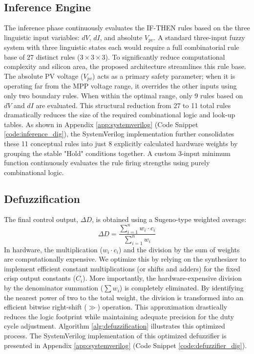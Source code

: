 \documentclass[a4paper,oneside,12pt]{report}
\numberwithin{equation}{chapter}
\begin{document}
\subsection{Inference Engine}
The inference phase continuously evaluates the IF-THEN rules based on the three linguistic input variables: $dV$, $dI$, and absolute $V_{pv}$. A standard three-input fuzzy system with three linguistic states each would require a full combinatorial rule base of 27 distinct rules ($3 \times 3 \times 3$). To significantly reduce computational complexity and silicon area, the proposed architecture streamlines this rule base. The absolute PV voltage ($V_{pv}$) acts as a primary safety parameter; when it is operating far from the MPP voltage range, it overrides the other inputs using only two boundary rules. When within the optimal range, only 9 rules based on $dV$ and $dI$ are evaluated. This structural reduction from 27 to 11 total rules dramatically reduces the size of the required combinational logic and look-up tables.
As shown in Appendix \ref{app:systemverilog} (Code Snippet \ref{code:inference_dig}), the SystemVerilog implementation further consolidates these 11 conceptual rules into just 8 explicitly calculated hardware weights by grouping the stable "Hold" conditions together. A custom 3-input minimum function continuously evaluates the rule firing strengths using purely combinational logic.

\subsection{Defuzzification}
The final control output, $\Delta D$, is obtained using a Sugeno-type weighted average:
\begin{equation}
    \Delta D = \frac{\sum_{i=1}^{n} w_i \cdot c_i}{\sum_{i=1}^{n} w_i}
\end{equation}
In hardware, the multiplication ($w_i \cdot c_i$) and the division by the sum of weights are computationally expensive. We optimize this by relying on the synthesizer to implement efficient constant multiplications (or shifts and adders) for the fixed crisp output constants ($C_i$). More importantly, the hardware-expensive division by the denominator summation ($\sum w_i$) is completely eliminated. By identifying the nearest power of two to the total weight, the division is transformed into an efficient bitwise right-shift ($\gg$) operation. This approximation drastically reduces the logic footprint while maintaining adequate precision for the duty cycle adjustment. Algorithm \ref{alg:defuzzification} illustrates this optimized process. The SystemVerilog implementation of this optimized defuzzifier is presented in Appendix \ref{app:systemverilog} (Code Snippet \ref{code:defuzzifier_dig}).
\end{document}
